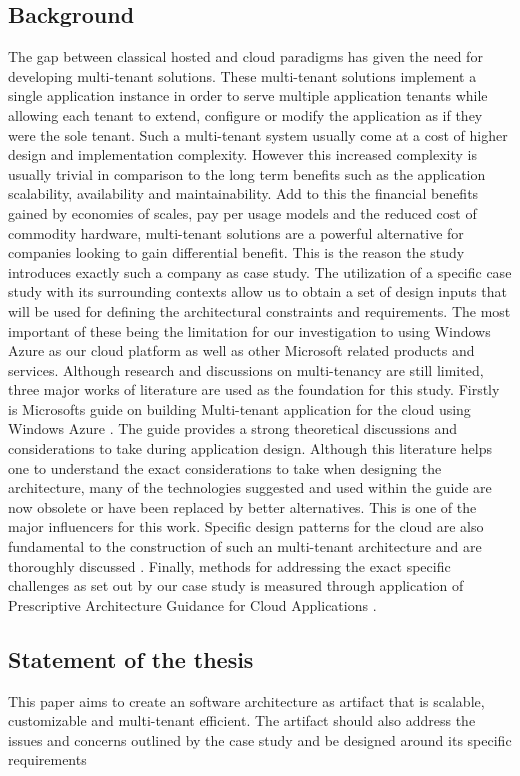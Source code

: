 \subsection{Background}
The gap between classical hosted and cloud paradigms has given the need for developing multi-tenant solutions. These multi-tenant solutions implement a single application instance in order to serve multiple application tenants while allowing each tenant to extend, configure or modify the application as if they were the sole tenant. Such a multi-tenant system usually come at a cost of higher design and implementation complexity. However this increased complexity is usually trivial in comparison to the long term benefits such as the application scalability, availability and maintainability. Add to this the financial benefits gained by economies of scales, pay per usage models and the reduced cost of commodity hardware, multi-tenant solutions are a powerful alternative for companies looking to gain differential benefit. This is the reason the study introduces exactly such a company as case study. The utilization of a specific case study with its surrounding contexts allow us to obtain a set of design inputs that will be used for defining the architectural constraints and requirements. The most important of these being the limitation for our investigation to using Windows Azure as our cloud platform as well as other Microsoft related products and services.  Although research and discussions on multi-tenancy are still limited, three major works of literature are used as the foundation for this study. Firstly is Microsofts guide on building Multi-tenant application for the cloud using Windows Azure \cite{Betts2012-ad}. The guide provides a strong theoretical discussions and considerations to take during application design. Although this literature helps one to understand the exact considerations to take when designing the architecture, many of the technologies suggested and used within the guide are now obsolete or have been replaced by better alternatives. This is one of the major influencers for this work. Specific design patterns for the cloud are also fundamental to the construction of such an multi-tenant architecture and are thoroughly discussed \cite{Wilder2012-so}. Finally, methods for addressing the exact specific challenges as set out by our case study is measured through application of Prescriptive Architecture Guidance for Cloud Applications \cite{Homer2014}. 

\subsection{Statement of the thesis}
\begin{fancyquotes}
This paper aims to create an software architecture as artifact that is scalable, customizable and multi-tenant efficient. The artifact should also address the issues and concerns outlined by the case study and be designed around its specific requirements
\end{fancyquotes}

